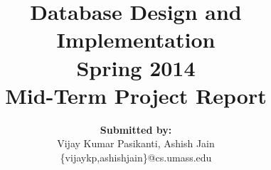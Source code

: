 \documentclass[11pt,letterpaper, one-sided]{article}
\newcommand\course{Database Design and Implementation}
\newcommand\semester{Spring 2014}     %
\newcommand\yourname{Vijay Kumar Pasikanti} %
\newcommand\testname{Mid-Term Project Report}
\newenvironment{answer}[1]{
  \subsection*	{#1}
}
\begin{document}
\title{\large{\textbf{\Large\course}\\ \semester \\\textbf{\testname}}}
\author{\textbf{Submitted by:} \\ \yourname, Ashish Jain\\\{vijaykp,ashishjain\}@cs.umass.edu}
\maketitle

\begin{answer}{Introduction:}
Graph data management systems have been receiving a lot of attention with the arrival of various social networks like Facebook, Twitter, Google+ etc. All these social networks have their data stored in some or the other form of graph with billions of nodes. Graph databases processing relations between nodes effectively and their efficiency on running graph queries have made relational databases not a preferred choice for these kind of applications. Connectivity and adjacency between nodes in these networks can reveal interesting properties if one has to analyze them. Clustering is one of the graph properties which when applied to social networks produces communities which are tightly connected within themselves. \\\\
The goal of the project is to present a comprehensive study of performance of various graph databases on community detection algorithms. The next few sections of the report talk about the design, implementation and evaluation.
\end{answer}
\end{document}

